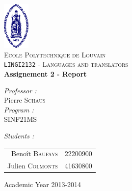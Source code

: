 \begin{titlepage}
 
\begin{center}
 
\vspace*{-2cm}\includegraphics[width=0.10\textwidth]{ucl.png}\\[1cm]
 
\textsc{\LARGE Ecole Polytechnique de Louvain}\\[1.5cm]
 
\textsc{\Large \texttt{LINGI2132} - Languages and translators }\\[0.5cm]
 
 
\vspace{1.0cm}
{ \huge \bfseries Assignement 2 - Report\vspace{0.8cm}\\}
 
\vspace{1.0cm}
 
\begin{minipage}{0.4\textwidth}
\begin{flushleft} \large
\emph{Professor :}\\
	Pierre \textsc{Schaus}\\
\vspace{1cm}
\emph{Program :}\\
	SINF21MS
\end{flushleft}
\end{minipage}
\begin{minipage}{0.4\textwidth}
\begin{flushright} \large
\emph{Students :} \\
\begin{tabular}{rl}
	Benoît \textsc{Baufays}		& {\footnotesize 22200900}\\
	Julien \textsc{Colmonts}	& {\footnotesize 41630800}\\

\end{tabular}
\end{flushright}
\end{minipage}
 
\vfill
 
\vspace{1.1cm}
{\large Academic Year 2013-2014}
\vspace{-1cm} 
\end{center}
 
\end{titlepage}
